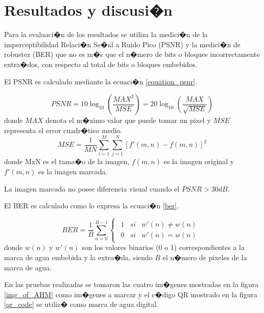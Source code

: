 \documentclass{rcci} %
\begin{document}
\section{Resultados y discusi�n}

Para la evaluaci�n de los resultados se utiliza la medici�n de la imperceptibilidad Relaci�n Se�al a Ruido Pico (PSNR) y la medici�n de robustez (BER)
que no es m�s que el n�mero de bits o bloques incorrectamente extra�dos, con respecto al total de bits o bloques embebidos.

El PSNR es calculado mediante la ecuaci�n \ref{equation_psnr}.

\begin{equation}
PSNR=10\log_{10}\left(\frac{MAX^{2}}{MSE}\right)=20\log_{10}\left(\frac{MAX}{\sqrt{MSE}}\right)
\label{equation_psnr}
\end{equation}
donde $MAX$ denota el m�ximo valor que puede tomar un pixel y $MSE$
representa el error cuadr�tico medio.
\begin{equation}
MSE=\frac{1}{MN}\sum_{i=1}^{M}\sum_{j=1}^{N}\left[f'(m,n)-f(m,n)\right]^{2}
\end{equation}
donde MxN es el tama�o de la imagen, $f(m,n)$ es la imagen original y $f'(m,n)$ es la imagen marcada.

La imagen marcada no posee diferencia visual cuando el $PSNR>30dB$. \parencite{Cao2010}

El BER es calculado como lo expresa la ecuaci�n \ref{ber}.

\begin{equation}
BER=\frac{1}{B}\sum_{n=0}^{B-1}\begin{cases}
\begin{array}{ccc}
1 & si & w'(n)\neq w(n)\\
0 & si & w'(n)=w(n)
\end{array}\end{cases}
\label{ber}
\end{equation}
donde $w(n)$ y $w'(n)$ son los valores binarios (0 o 1) correspondientes a la marca de agua embebida y la
extra�da, siendo $B$ el n�mero de pixeles de la marca de agua.

En las pruebas realizadas se tomaron las cuatro im�genes mostradas en la figura \ref{img_of_AHM} como im�genes
a marcar y el c�digo QR mostrado en la figura \ref{qr_code} se utiliz� como marca de agua digital.
\end{document}
